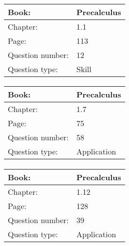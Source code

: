 \documentclass{article}
\begin{document}
            \paragraph{}
            \begin{tabularx}{1\textwidth}{
                    p{}
                    p{}
                }
                \toprule
                Book: & Precalculus
                \\
                \midrule
                Chapter: & 1.1
                \\
                \midrule
                Page: & 113
                \\
                \midrule
                Question number: & 12
                \\
                \midrule
                Question type: & Skill
                \\
                \bottomrule
            \end{tabularx}
            
            \paragraph{}
            \begin{tabularx}{1\textwidth}{
                    p{}
                    p{}
                }
                \toprule
                Book: & Precalculus
                \\
                \midrule
                Chapter: & 1.7
                \\
                \midrule
                Page: & 75
                \\
                \midrule
                Question number: & 58
                \\
                \midrule
                Question type: & Application
                \\
                \bottomrule
            \end{tabularx}
            
            \paragraph{}
            \begin{tabularx}{1\textwidth}{
                    p{}
                    p{}
                }
                \toprule
                Book: & Precalculus
                \\
                \midrule
                Chapter: & 1.12
                \\
                \midrule
                Page: & 128
                \\
                \midrule
                Question number: & 39
                \\
                \midrule
                Question type: & Application
                \\
                \bottomrule
            \end{tabularx}
            
\end{document}
